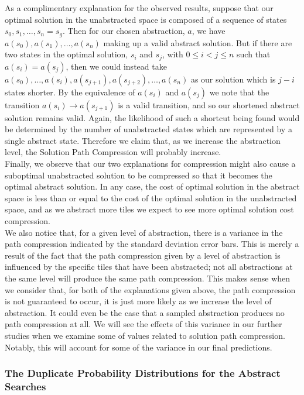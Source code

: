 \documentclass{article}
\begin{document}
As a complimentary explanation for the observed results, suppose that our optimal solution in the unabstracted space is composed of a sequence of states \(s_0, s_1, \ldots, s_n = s_g\).
Then for our chosen abstraction, \(a\), we have \(a(s_0), a(s_1), \ldots, a(s_n)\) making up a valid abstract solution.
But if there are two states in the optimal solution,
\(s_i\) and \(s_j\), with \(0 \leq i < j \leq n\) such that \(a(s_i) = a(s_j)\),
then we could instead take \(a(s_0),\ldots,a(s_i),a(s_{j+1}),a(s_{j+2}),\ldots,a(s_n)\) as our solution
which is \(j - i\) states shorter. By the equivalence of \(a(s_i)\) and \(a(s_j)\) we note that
the transition \(a(s_i) \rightarrow a(s_{j+1})\) is a valid transition,
and so our shortened abstract solution remains valid.
Again, the likelihood of such a shortcut being found would be determined by the number of unabstracted states
which are represented by a single abstract state.
Therefore we claim that, as we increase the abstraction level,
the Solution Path Compression will probably increase. \\

Finally,
we observe that our two explanations for compression might
also cause a suboptimal unabstracted solution to be compressed so
that it becomes the optimal abstract solution. In any case,
the cost of optimal solution in the abstract space is less than
or equal to the cost of the optimal solution in the unabstracted space,
and as we abstract more tiles we expect to see more optimal solution cost compression.\\

We also notice that, for a given level of abstraction,
there is a variance in the path compression indicated by the standard deviation error bars.
This is merely a result of the fact that the path compression given by a level of abstraction is
influenced by the specific tiles that have been abstracted;
not all abstractions at the same level will produce the same path compression.
This makes sense when we consider that, for both of the explanations given above,
the path compression is not guaranteed to occur, it is just more likely as we increase the level of abstraction.
It could even be the case that a sampled abstraction produces no path compression at all.
We will see the effects of this variance in our further studies when we examine some
of values related to solution path compression. Notably, this will account for some of the variance
in our final predictions.

\subsubsection*{The Duplicate Probability Distributions for the Abstract Searches}
\end{document}
